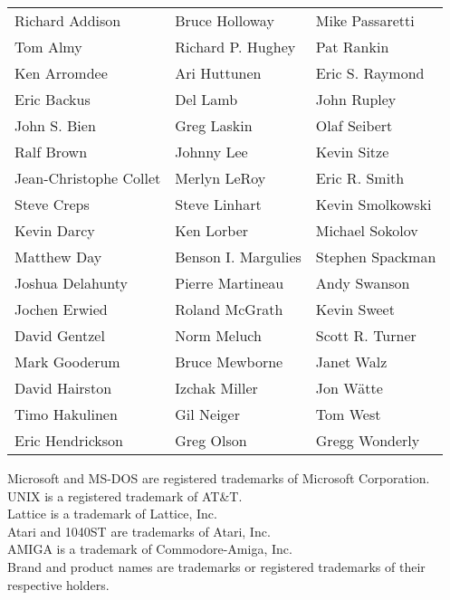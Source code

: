 \begin{center}
\begin{tabular}{lll}
Richard Addison         & Bruce Holloway        & Mike Passaretti \\
Tom Almy                & Richard P. Hughey     & Pat Rankin      \\
Ken Arromdee            & Ari Huttunen          & Eric S. Raymond \\
Eric Backus             & Del Lamb              & John Rupley     \\
John S. Bien            & Greg Laskin           & Olaf Seibert    \\
Ralf Brown              & Johnny Lee            & Kevin Sitze     \\
Jean-Christophe Collet  & Merlyn LeRoy          & Eric R. Smith   \\
Steve Creps             & Steve Linhart         & Kevin Smolkowski\\
Kevin Darcy             & Ken Lorber            & Michael Sokolov \\
Matthew Day             & Benson I. Margulies   & Stephen Spackman\\
Joshua Delahunty        & Pierre Martineau      & Andy Swanson    \\
Jochen Erwied           & Roland McGrath        & Kevin Sweet     \\
David Gentzel           & Norm Meluch           & Scott R. Turner \\
Mark Gooderum           & Bruce Mewborne        & Janet Walz      \\
David Hairston          & Izchak Miller         & Jon W\"atte     \\
Timo Hakulinen          & Gil Neiger            & Tom West        \\
Eric Hendrickson        & Greg Olson            & Gregg Wonderly
\end{tabular}
\end{center}

\vfill
\begin{flushleft}
\small
Microsoft and MS-DOS are registered trademarks of Microsoft Corporation.\\
UNIX is a registered trademark of AT\&T.\\
Lattice is a trademark of Lattice, Inc.\\
Atari and 1040ST are trademarks of Atari, Inc.\\
AMIGA is a trademark of Commodore-Amiga, Inc.\\
Brand and product names are trademarks or registered trademarks
of their respective holders.
\end{flushleft}

